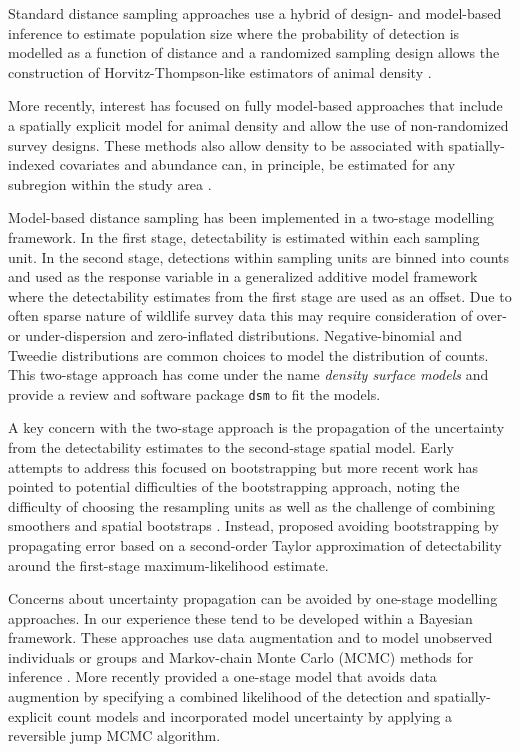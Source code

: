 \documentclass[preprint,12pt]{elsarticle}
\begin{document}
Standard distance sampling approaches use a hybrid of design- and model-based inference to estimate population size where the probability of detection is modelled as a function of distance and a randomized sampling design allows the construction of Horvitz-Thompson-like estimators of animal density \citep{horvitz_generalization_1952,  buckland_advanced_2004}.

More recently, interest has focused on fully model-based approaches that include a spatially explicit model for animal density and allow the use of non-randomized survey designs.  These methods also allow density to be associated with spatially-indexed covariates and abundance can, in principle, be estimated for any subregion within the study area \citep{johnson_model-based_2010, miller_spatial_2013, buckland_model-based_2016}.  

Model-based distance sampling has been implemented in a two-stage modelling framework.  In the first stage, detectability is estimated within each sampling unit.  In the second stage, detections within sampling units are binned into counts and used as the response variable in a generalized additive model framework where the detectability estimates from the first stage are used as an offset.  Due to often sparse nature of wildlife survey data this may require consideration of over- or under-dispersion and zero-inflated distributions.  Negative-binomial and Tweedie distributions are common choices to model the distribution of counts.  This two-stage approach has come under the name \textit{density surface models} and \cite{miller_spatial_2013} provide a review and software package \texttt{dsm} to fit the models.  

A key concern with the two-stage approach is the propagation of the uncertainty from the detectability estimates to the second-stage spatial model.  Early attempts to address this focused on bootstrapping \citep{lahiri_resampling_2003, hedley_spatial_2004} but more recent work has pointed to potential difficulties of the bootstrapping approach, noting the difficulty of choosing the resampling units as well as the challenge of combining smoothers and spatial bootstraps \citep{bravington_reliable_2018-1}. Instead, \cite{bravington_reliable_2018-1}  proposed avoiding bootstrapping by propagating error based on a second-order Taylor approximation of detectability around the first-stage maximum-likelihood estimate.

Concerns about uncertainty propagation can be avoided by one-stage modelling approaches.  In our experience these tend to be developed within a Bayesian framework.  These approaches use data augmentation and to model unobserved individuals or groups and Markov-chain Monte Carlo (MCMC) methods for inference \citep{royle_hierarchical_2008, schmidt_using_2012}.  More recently  \cite{oedekoven_bayesian_2014} provided a one-stage model that avoids data augmention by specifying a combined likelihood of the detection and spatially-explicit count models and incorporated model uncertainty by applying a reversible jump MCMC algorithm.
\end{document}
